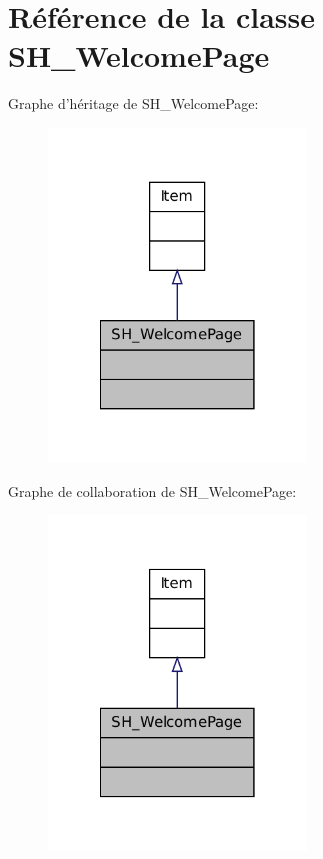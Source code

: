 \hypertarget{classSH__WelcomePage}{\section{Référence de la classe S\-H\-\_\-\-Welcome\-Page}
\label{classSH__WelcomePage}
}


Graphe d'héritage de S\-H\-\_\-\-Welcome\-Page\-:\nopagebreak
\begin{figure}[H]
\begin{center}
\leavevmode
\includegraphics[width=194pt]{classSH__WelcomePage__inherit__graph}
\end{center}
\end{figure}


Graphe de collaboration de S\-H\-\_\-\-Welcome\-Page\-:\nopagebreak
\begin{figure}[H]
\begin{center}
\leavevmode
\includegraphics[width=194pt]{classSH__WelcomePage__coll__graph}
\end{center}
\end{figure}
